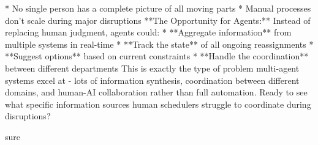 \begin{botresponse}
*   No single person has a complete picture of all moving parts
*   Manual processes don't scale during major disruptions
**The Opportunity for Agents:** Instead of replacing human judgment, agents could:
*   **Aggregate information** from multiple systems in real-time
*   **Track the state** of all ongoing reassignments
*   **Suggest options** based on current constraints
*   **Handle the coordination** between different departments
This is exactly the type of problem multi-agent systems excel at - lots of information synthesis, coordination between different domains, and human-AI collaboration rather than full automation.
Ready to see what specific information sources human schedulers struggle to coordinate during disruptions?
\end{botresponse}

\begin{userprompt}
sure
\end{userprompt}

